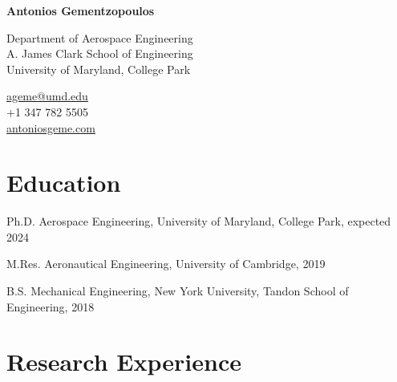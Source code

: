 \documentclass[12pt,letterpaper]{report}
\newcommand{\myname}{Antonios Gementzopoulos}
\newcommand{\namefont}[1]{{\normalfont\bfseries\Huge{#1}}}
\begin{document}
    \raggedright{}

    \namefont{\myname}

    \vspace{1em}
    \begin{minipage}[t]{0.700\textwidth}
        Department of Aerospace Engineering \\
        A. James Clark School of Engineering \\
        University of Maryland, College Park
    \end{minipage}
    \begin{minipage}[t]{0.295\textwidth}
        \flushright{}
        \href{mailto:ageme@umd.edu}{ageme@umd.edu} \\
        +1 347 782 5505 \\
        \href{https://antoniosgeme.com}{antoniosgeme.com}
    \end{minipage}


    \section*{Education}

    \begin{tablist}

        \item[Ph.D.] \tab{}Aerospace Engineering, University of Maryland, College Park, expected 2024
        \item[M.Res.]  \tab{}Aeronautical Engineering, University of Cambridge, 2019
        \item[B.S.]  \tab{}Mechanical Engineering, New York University, Tandon School of Engineering, 2018

    \end{tablist}


    \section*{Research Experience}
\end{document}
